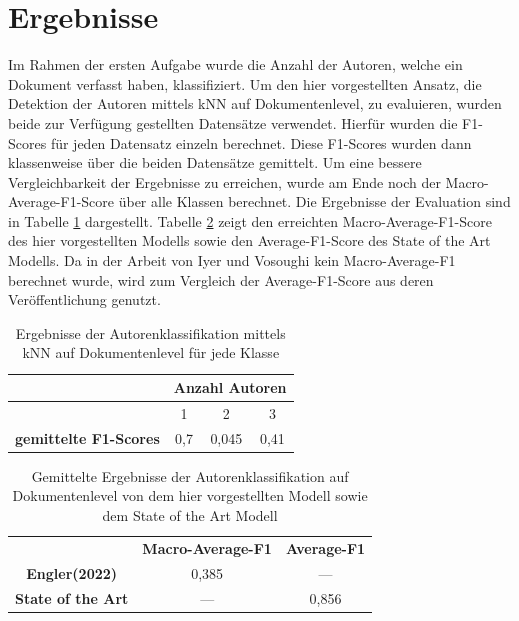\documentclass[conference]{IEEEtran}
\begin{document}
\section{Ergebnisse}
	Im Rahmen der ersten Aufgabe wurde die Anzahl der Autoren, welche ein Dokument verfasst haben, klassifiziert. Um den hier vorgestellten Ansatz, die Detektion der Autoren mittels kNN auf Dokumentenlevel, zu evaluieren, wurden beide zur Verfügung gestellten Datensätze verwendet. Hierfür wurden die F1-Scores für jeden Datensatz einzeln berechnet. Diese F1-Scores wurden dann klassenweise über die beiden Datensätze gemittelt. Um eine bessere Vergleichbarkeit der Ergebnisse zu erreichen, wurde am Ende noch der Macro-Average-F1-Score über alle Klassen berechnet. Die Ergebnisse der Evaluation sind in Tabelle \ref{tab:erg1} dargestellt. Tabelle \ref{tab:erg2} zeigt den erreichten Macro-Average-F1-Score des hier vorgestellten Modells sowie den Average-F1-Score des State of the Art Modells. Da in der Arbeit von Iyer und Vosoughi kein Macro-Average-F1 berechnet wurde, wird zum Vergleich der Average-F1-Score aus deren Veröffentlichung genutzt.
	
	\begin{table}[htbp]
		\caption{Ergebnisse der Autorenklassifikation mittels kNN auf Dokumentenlevel für jede Klasse }
		\begin{center}
			\begin{tabular}{|c|c|c|c|}
				\hline
				 & \multicolumn{3}{|c|}{\textbf{Anzahl Autoren}} \tabularnewline
				\hline
				 & 1 & 2 & 3 \\
				 \hline
				 \textbf{gemittelte F1-Scores} & 0,7 & 0,045 & 0,41 \\
				 \hline
			\end{tabular}
			\label{tab:erg1}
		\end{center}
	\end{table}
	\begin{table}[htbp]
		\caption{Gemittelte Ergebnisse der Autorenklassifikation auf Dokumentenlevel von dem hier vorgestellten Modell sowie dem State of the Art Modell}
		\begin{center}
			\begin{tabular}{|ccc|}
				\hline
				& \textbf{Macro-Average-F1} & \textbf{Average-F1} \\
				\cellcolor{gray!15}\textbf{Engler(2022)} & \cellcolor{gray!15}0,385 & \cellcolor{gray!15} --- \\
				\textbf{State of the Art} & --- & 0,856 \\
				\hline
			\end{tabular}
			\label{tab:erg2}
		\end{center}
	\end{table}
	
\end{document}
